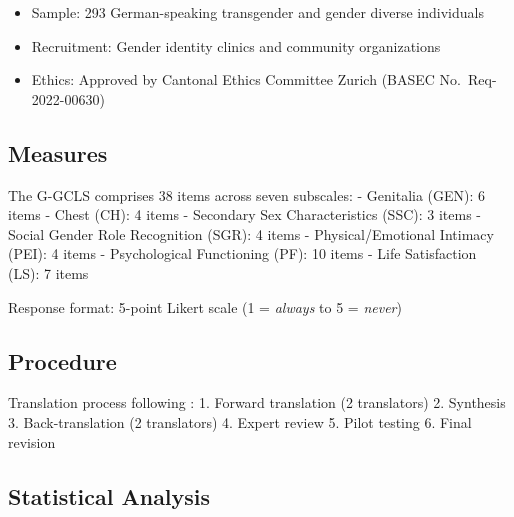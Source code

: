 \documentclass[
  english,
  man]{apa6}
\providecommand{\tightlist}{%
  \setlength{\itemsep}{0pt}\setlength{\parskip}{0pt}}
\begin{document}
\begin{itemize}
\tightlist
\item
  Sample: 293 German-speaking transgender and gender diverse individuals
\item
  Recruitment: Gender identity clinics and community organizations
\item
  Ethics: Approved by Cantonal Ethics Committee Zurich (BASEC No.~Req-2022-00630)
\end{itemize}

\subsection{Measures}\label{measures}

The G-GCLS comprises 38 items across seven subscales:
- Genitalia (GEN): 6 items
- Chest (CH): 4 items
- Secondary Sex Characteristics (SSC): 3 items
- Social Gender Role Recognition (SGR): 4 items
- Physical/Emotional Intimacy (PEI): 4 items
- Psychological Functioning (PF): 10 items
- Life Satisfaction (LS): 7 items

Response format: 5-point Likert scale (1 = \emph{always} to 5 = \emph{never})

\subsection{Procedure}\label{procedure}

Translation process following \citet{beaton2000}:
1. Forward translation (2 translators)
2. Synthesis
3. Back-translation (2 translators)
4. Expert review
5. Pilot testing
6. Final revision

\subsection{Statistical Analysis}\label{statistical-analysis}
\end{document}
